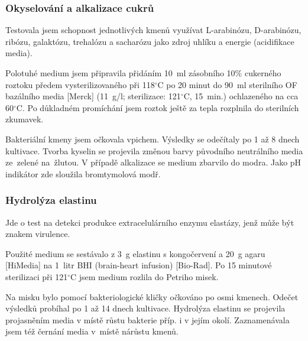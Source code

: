\subsubsection{Okyselování a alkalizace cukrů}
Testovala jsem schopnost jednotlivých kmenů využívat L-arabinózu, D-arabinózu, ribózu, galaktózu, trehalózu a sacharózu jako zdroj uhlíku a energie (acidifikace media).

Polotuhé medium jsem připravila přidáním 10~ml zásobního 10\% cukerného roztoku předem vysterilizovaného při 118$^{\circ}$C po 20 minut do 90~ml sterilního OF bazálního media [Merck] (11~g/l; sterilizace: 121$^{\circ}$C, 15~min.) ochlazeného na cca 60$^{\circ}$C.
Po důkladném promíchání jsem roztok ještě za tepla rozplnila do sterilních zkumavek.

Bakteriální kmeny jsem očkovala vpichem.
Výsledky se odečítaly po 1 až 8 dnech kultivace.
Tvorba kyselin se projevila změnou barvy původního neutrálního media ze~zelené na~žlutou.
V případě alkalizace se medium zbarvilo do modra.
Jako pH indikátor zde sloužila bromtymolová modř.

\subsubsection{Hydrolýza elastinu}
Jde o test na detekci produkce extracelulárního enzymu elastázy, jenž může být znakem virulence.

Použité medium se sestávalo z 3~g elastinu s kongočervení a 20~g agaru [HiMedia] na 1~litr BHI (brain-heart infusion) [Bio-Rad].
Po 15 minutové sterilizaci při 121$^{\circ}$C jsem medium rozlila do Petriho misek.

Na misku bylo pomocí bakteriologické kličky očkováno po osmi kmenech.
Odečet výsledků probíhal po 1 až 14 dnech kultivace.
Hydrolýza elastinu se projevila projasněním media v místě růstu bakterie příp. i v jejím okolí.
Zaznamenávala jsem též černání media v~místě nárůstu kmenů.

\shorthandon{-} 
